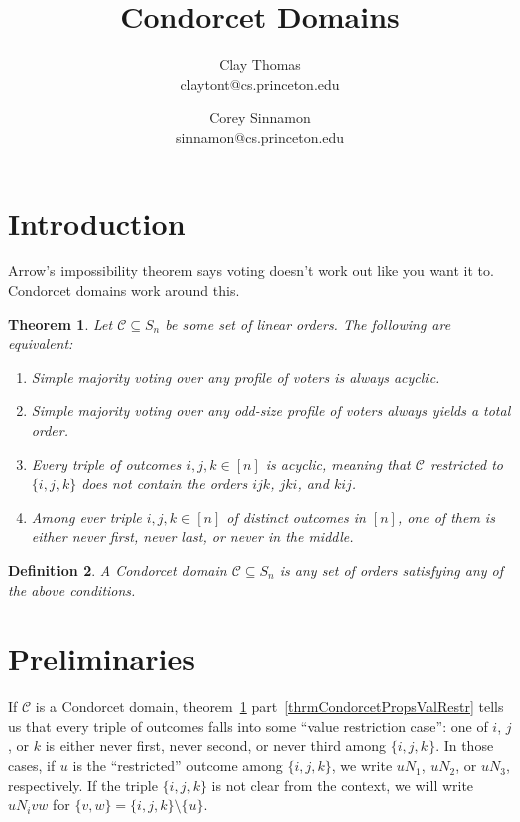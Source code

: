 \documentclass[12pt]{article}
\newtheorem{theorem}{Theorem}
\newtheorem{definition}[theorem]{Definition}
\newcommand{\C}{\mathcal{C}}
\newcommand{\1}[1]{\mathds{1}[{#1}]}
\begin{document}
\title{
  Condorcet Domains
}
\author{
  Clay Thomas \\
  claytont@cs.princeton.edu
\and
  Corey Sinnamon \\
  sinnamon@cs.princeton.edu
}

\maketitle

\section{Introduction}

  Arrow's impossibility theorem says voting doesn't work out like you want it to.
  Condorcet domains work around this.

  \begin{theorem} \label{thrmCondorcetProps}
    Let $\C \subseteq S_n$ be some set of linear orders.
    The following are equivalent:
    \begin{enumerate}
      \item Simple majority voting over any profile of voters is always acyclic.
      \item Simple majority voting over any odd-size profile of voters
        always yields a total order.
      \item Every triple of outcomes $i,j,k\in[n]$ is \emph{acyclic}, meaning
        that $\C$ restricted to $\{i,j,k\}$ does not contain the orders
        $ijk$, $jki$, and $kij$.
      \item \label{thrmCondorcetPropsValRestr}
        Among ever triple $i,j,k\in [n]$ of distinct outcomes in $[n]$,
        one of them is either never first, never last, or never in the middle.
    \end{enumerate}

  \end{theorem}
  \begin{definition}
    A Condorcet domain $\C\subseteq S_n$ is any set of orders satisfying any of
    the above conditions.
  \end{definition}

\section{Preliminaries}

  If $\C$ is a Condorcet domain, theorem~\ref{thrmCondorcetProps}
  part~\ref{thrmCondorcetPropsValRestr} tells us that every triple of outcomes
  falls into some ``value restriction case'': one of $i$, $j$, or $k$ is either
  never first, never second, or never third among $\{i,j,k\}$.
  In those cases, if $u$ is the ``restricted'' outcome among $\{i,j,k\}$,
  we write $u N_1$, $u N_2$, or $u N_3$, respectively.
  If the triple $\{i,j,k\}$ is not clear from the context, we will write
  $u N_i vw$ for $\{v,w\} = \{i,j,k\} \setminus \{u\}$.
\end{document}
